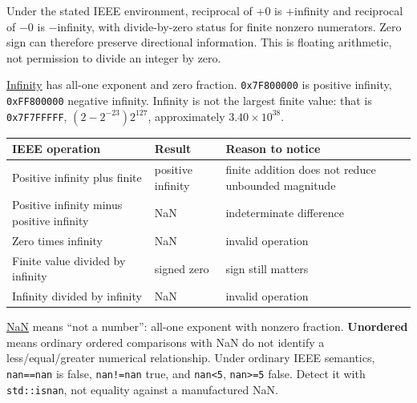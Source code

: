 Under the stated IEEE environment, reciprocal of +0 is +infinity and reciprocal of −0 is −infinity, with divide-by-zero status for finite nonzero numerators. Zero sign can therefore preserve directional information. This is floating arithmetic, not permission to divide an integer by zero.

\hyperref[appendix-eb336149c00a]{Infinity} has all-one exponent and zero fraction. \texttt{0x7F800000} is positive infinity, \texttt{0xFF800000} negative infinity. Infinity is not the largest finite value: that is \texttt{0x7F7FFFFF}, \((2-2^{-23})2^{127}\), approximately \(3.40\times10^{38}\).

{\def\LTcaptype{none} %
\begin{longtable}[]{@{}
  >{\raggedright\arraybackslash}p{}
  >{\raggedright\arraybackslash}p{}
  >{\raggedright\arraybackslash}p{}@{}}
\toprule\noalign{}
\begin{minipage}[b]{\linewidth}\raggedright
IEEE operation
\end{minipage} & \begin{minipage}[b]{\linewidth}\raggedright
Result
\end{minipage} & \begin{minipage}[b]{\linewidth}\raggedright
Reason to notice
\end{minipage} \\
\midrule\noalign{}
\endhead
\bottomrule\noalign{}
\endlastfoot
Positive infinity plus finite & positive infinity & finite addition does not reduce unbounded magnitude \\
Positive infinity minus positive infinity & NaN & indeterminate difference \\
Zero times infinity & NaN & invalid operation \\
Finite value divided by infinity & signed zero & sign still matters \\
Infinity divided by infinity & NaN & invalid operation \\
\end{longtable}
}

\hyperref[appendix-d6607cc4c235]{NaN} means ``not a number'': all-one exponent with nonzero fraction. \textbf{Unordered} means ordinary ordered comparisons with NaN do not identify a less/equal/greater numerical relationship. Under ordinary IEEE semantics, \texttt{nan==nan} is false, \texttt{nan!=nan} true, and \texttt{nan\textless{}5}, \texttt{nan\textgreater{}=5} false. Detect it with \texttt{std::isnan}, not equality against a manufactured NaN.

